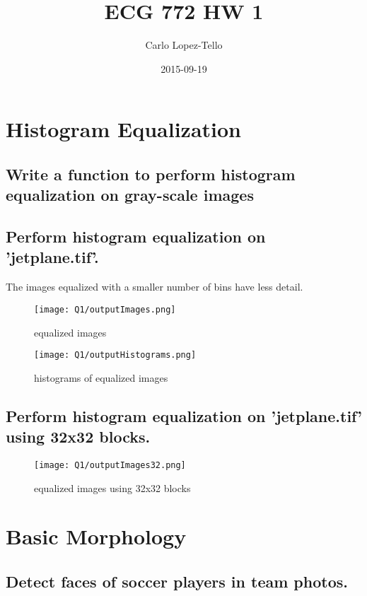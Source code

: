 \documentclass{article}
\title{ECG 772 HW 1}
\date{2015-09-19}
\author{Carlo Lopez-Tello}
\begin{document}
\maketitle
	\newpage
	\section{Histogram Equalization}
	
	\subsection{Write a function to perform histogram equalization on gray-scale images}
	
	
	\subsection{Perform histogram equalization on 'jetplane.tif'.}
	The images equalized with a smaller number of bins have less detail.
	\begin{figure}[H]
		\texttt{[image: Q1/outputImages.png]}
		\caption{equalized images}
	\end{figure}
	\begin{figure}[H]
		\texttt{[image: Q1/outputHistograms.png]}
		\caption{histograms of equalized images}
	\end{figure}
	
	\subsection{Perform histogram equalization on 'jetplane.tif' using 32x32 blocks.}
	\begin{figure}[H]
		\texttt{[image: Q1/outputImages32.png]}
		\caption{equalized images using 32x32 blocks}
	\end{figure}
	
	\newpage
	\section{Basic Morphology}
	
	\subsection{Detect faces of soccer players in team photos.}
	
\end{document}

